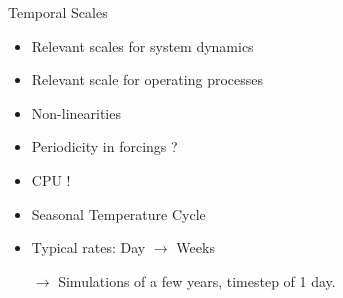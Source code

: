 \documentclass[final,xcolor=dvipsnames]{beamer}
\begin{document}
      \begin{frame}
	\begin{block}{Temporal Scales}
	  \begin{itemize}[<+->]
	    \item Relevant scales for system dynamics
	    \item Relevant scale for operating processes
	    \item Non-linearities
	    \item Periodicity in forcings ?  
	    \item CPU ! 
	  \end{itemize}
	\end{block}
	
      \end{frame}
      
      \begin{frame}
	\begin{exampleblock}{}
	  \begin{itemize}[<+->]
	    \item Seasonal Temperature Cycle
	    \item Typical rates: Day $\rightarrow$ Weeks
	    \item[$\rightarrow$] Simulations of a few years, timestep of 1 day.
	  \end{itemize}
	\end{exampleblock}
      \end{frame}
      
\end{document}

